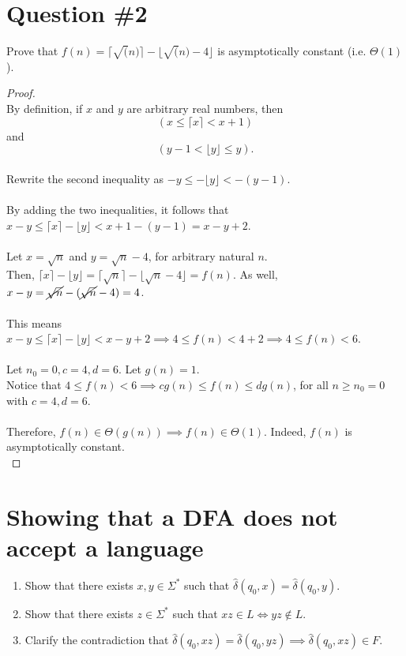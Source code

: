 \documentclass[12pt]{article}
\begin{document}
\section*{Question \#2}
Prove that \( f(n) = \lceil \sqrt(n) \rceil - \lfloor \sqrt(n) - 4 \rfloor\) is asymptotically constant (i.e. \( \Theta(1)\)).
\begin{proof}
\leavevmode\\
    By definition, if \(x\) and \(y\) are arbitrary real numbers, then \[ (x \leq \lceil x \rceil < x + 1) \] and \[ (y - 1 < \lfloor y \rfloor \leq y) \text{.} \] \\
    Rewrite the second inequality as \( -y \leq - \lfloor y \rfloor < - (y - 1) \). \\
    \\
    By adding the two inequalities, it follows that \( x - y \leq \lceil x \rceil - \lfloor y \rfloor < x + 1 - (y - 1) = x - y + 2 \). \\
    \\
    Let \( x = \sqrt{n} \) and \( y = \sqrt{n} - 4 \), for arbitrary natural \( n \). \\
    Then, \( \lceil x \rceil - \lfloor y \rfloor = \lceil \sqrt{n} \rceil - \lfloor \sqrt{n} - 4 \rfloor = f(n) \). As well, \( x - y = \cancel{\sqrt{n}} - (\cancel{\sqrt{n}} - 4) = 4 \). \\
    \\
    This means \( x - y \leq \lceil x \rceil - \lfloor y \rfloor < x - y + 2 \implies 4 \leq f(n) < 4 + 2 \implies 4 \leq f(n) < 6 \). \\
    \\
    Let \( n_0 = 0, c = 4, d = 6 \). Let \( g(n) = 1 \). \\
    Notice that \( 4 \leq f(n) < 6 \implies cg(n) \leq f(n) \leq dg(n) \), for all \( n \geq n_0 = 0 \) with \( c = 4, d = 6 \). \\
    \\
    Therefore, \( f(n) \in \Theta(g(n)) \implies f(n) \in \Theta(1) \). Indeed, \( f(n) \) is asymptotically constant. \\
\end{proof}
\pagebreak

\section*{Showing that a DFA does not accept a language}
\begin{enumerate}
    \item Show that there exists \( x, y \in \Sigma ^* \) such that \( \hat{\delta}(q_0, x) = \hat{\delta}(q_0, y) \).
    \item Show that there exists \( z \in \Sigma^* \) such that \( xz \in L \iff yz \notin L \).
    \item Clarify the contradiction that \( \hat{\delta}(q_0, xz) = \hat{\delta}(q_0, yz) \implies \hat{\delta}(q_0, xz) \in F \).
\end{enumerate}
\pagebreak
\end{document}
